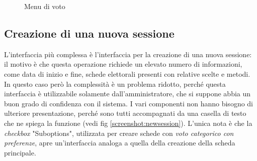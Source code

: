 \begin{figure}
	\centering
	\caption{Menu di voto}
	\label{screenshot:vote}
\end{figure}

\subsection{Creazione di una nuova sessione}
L'interfaccia più complessa è l'interfaccia per la creazione di una nuova sessione: il motivo è che questa operazione richiede un elevato numero di informazioni, come data di inizio e fine, schede elettorali presenti con relative scelte e metodi.
In questo caso però la complessità è un problema ridotto, perché questa interfaccia è utilizzabile solamente dall'amministratore, che si suppone abbia un buon grado di confidenza con il sistema.
I vari componenti non hanno bisogno di ulteriore presentazione, perché sono tutti accompagnati da una casella di testo che ne spiega la funzione (vedi fig \ref{screenshot:newsession}). L'unica nota è che la \emph{checkbox} "Suboptions", utilizzata per creare schede con \emph{voto categorico con preferenze}, apre un'interfaccia analoga a quella della creazione della scheda principale.

